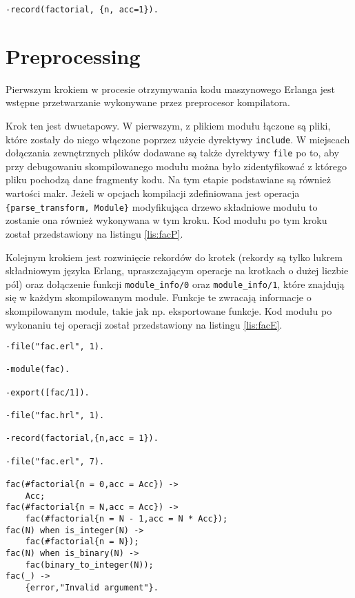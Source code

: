 \begin{lstlisting}[style=erlang, caption=Plik fac.hrl, label=lis:facHRL]
-record(factorial, {n, acc=1}).
\end{lstlisting}

\section{Preprocessing}

Pierwszym krokiem w procesie otrzymywania kodu maszynowego Erlanga jest wstępne przetwarzanie wykonywane przez preprocesor kompilatora.

Krok ten jest dwuetapowy. W pierwszym, z plikiem modułu łączone są pliki, które zostały do niego włączone poprzez użycie dyrektywy \texttt{\-include}. W miejscach dołączania zewnętrznych plików dodawane są także dyrektywy \texttt{\-file} po to, aby przy debugowaniu skompilowanego modułu można było zidentyfikować z którego pliku pochodzą dane fragmenty kodu. Na tym etapie podstawiane są również wartości makr. Jeżeli w opcjach kompilacji zdefiniowana jest operacja \texttt{\{parse\_transform, Module\}} modyfikująca drzewo składniowe modułu to zostanie ona również wykonywana w tym kroku.
Kod modułu po tym kroku został przedstawiony na listingu \ref{lis:facP}.

Kolejnym krokiem jest rozwinięcie rekordów do krotek (rekordy są tylko lukrem składniowym języka Erlang, upraszczającym operacje na krotkach o dużej liczbie pól) oraz dołączenie funkcji \texttt{module\_info/0} oraz \texttt{module\_info/1}, które znajdują się w każdym skompilowanym module.
Funkcje te zwracają informacje o skompilowanym module, takie jak np. eksportowane funkcje.
Kod modułu po wykonaniu tej operacji został przedstawiony na listingu \ref{lis:facE}.

\begin{lstlisting}[style=erlang, caption=Moduł \texttt{fac} po pierwszym przetworzeniu, label=lis:facP]
-file("fac.erl", 1).

-module(fac).

-export([fac/1]).

-file("fac.hrl", 1).

-record(factorial,{n,acc = 1}).

-file("fac.erl", 7).

fac(#factorial{n = 0,acc = Acc}) ->
    Acc;
fac(#factorial{n = N,acc = Acc}) ->
    fac(#factorial{n = N - 1,acc = N * Acc});
fac(N) when is_integer(N) ->
    fac(#factorial{n = N});
fac(N) when is_binary(N) ->
    fac(binary_to_integer(N));
fac(_) ->
    {error,"Invalid argument"}.
\end{lstlisting}

